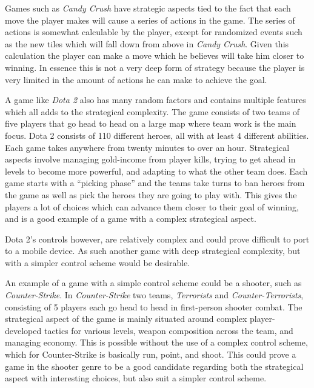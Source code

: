 Games such as \textit{Candy Crush}\cite{candycrush} have strategic aspects tied to the fact that each move the player makes will cause a series of actions in the game.
The series of actions is somewhat calculable by the player, except for randomized events such as the new tiles which will fall down from above in \textit{Candy Crush}.
Given this calculation the player can make a move which he believes will take him closer to winning.
In essence this is not a very deep form of strategy because the player is very limited in the amount of actions he can make to achieve the goal.

A game like \textit{Dota 2}\cite{Dota2} also has many random factors and contains multiple features which all adds to the strategical complexity.
The game consists of two teams of five players that go head to head on a large map where team work is the main focus.
Dota 2 consists of 110 different heroes, all with at least 4 different abilities.
Each game takes anywhere from twenty minutes to over an hour.
Strategical aspects involve managing gold-income from player kills, trying to get ahead in levels to become more powerful, and adapting to what the other team does.
Each game starts with a ``picking phase'' and the teams take turns to ban heroes from the game as well as pick the heroes they are going to play with.
This gives the players a lot of choices which can advance them closer to their goal of winning, and is a good example of a game with a complex strategical aspect.

Dota 2's controls however, are relatively complex and could prove difficult to port to a mobile device.
As such another game with deep strategical complexity, but with a simpler control scheme would be desirable.

An example of a game with a simple control scheme could be a shooter, such as \textit{Counter-Strike}.\cite{counterstrike}
In \textit{Counter-Strike} two teams, \emph{Terrorists} and \emph{Counter-Terrorists},
consisting of 5 players each go head to head in first-person shooter combat.
The strategical aspect of the game is mainly situated around complex
player-developed tactics for various levels, weapon composition across the
team, and managing economy.
This is possible without the use of a complex control scheme, which for Counter-Strike is basically run, point, and shoot.
This could prove a game in the shooter genre to be a good candidate regarding both the strategical aspect with interesting choices, but also suit a simpler control scheme.

